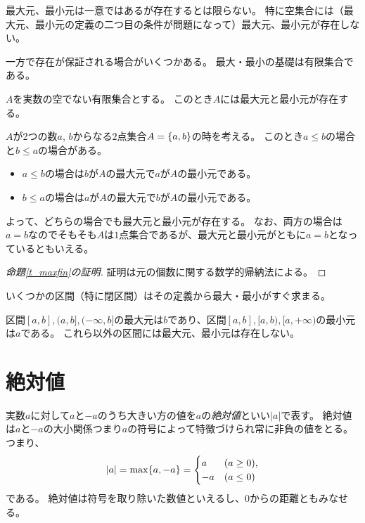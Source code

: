 最大元、最小元は一意ではあるが存在するとは限らない。
特に空集合には（最大元、最小元の定義の二つ目の条件が問題になって）最大元、最小元が存在しない。

一方で存在が保証される場合がいくつかある。
最大・最小の基礎は有限集合である。

\begin{proposition}
\label{t_maxfin}
$A$を実数の空でない有限集合とする。
このとき$A$には最大元と最小元が存在する。
\end{proposition}

\begin{example}
$A$が2つの数$a$, $b$からなる$2$点集合$A = \{ a, b \}$の時を考える。
このとき$a \le b$の場合と$b \le a$の場合がある。
\begin{itemize}
\item
$a \le b$の場合は$b$が$A$の最大元で$a$が$A$の最小元である。
\item
$b \le a$の場合は$a$が$A$の最大元で$b$が$A$の最小元である。
\end{itemize}
よって、どちらの場合でも最大元と最小元が存在する。
なお、両方の場合は$a = b$なのでそもそも$A$は$1$点集合であるが、最大元と最小元がともに$a = b$となっているともいえる。
\end{example}

\begin{proof}[命題\ref{t_maxfin}の証明]
証明は元の個数に関する数学的帰納法による。
\end{proof}

いくつかの区間（特に閉区間）はその定義から最大・最小がすぐ求まる。

\begin{example}
区間$[a, b], (a, b], (-\infty, b]$の最大元は$b$であり、区間$[a, b], [a, b), [a, +\infty)$の最小元は$a$である。
これら以外の区間には最大元、最小元は存在しない。
\end{example}

\section{絶対値}

実数$a$に対して$a$と$-a$のうち大きい方の値を$a$の\emph{絶対値}といい$|a|$で表す。
絶対値は$a$と$-a$の大小関係つまり$a$の符号によって特徴づけられ常に非負の値をとる。
つまり、
$$
|a| = \max\{ a, -a \} =
\begin{cases}
a & \text{($a \ge 0$),} \\
-a & \text{($a \le 0$)}
\end{cases}
$$
である。
絶対値は符号を取り除いた数値といえるし、$0$からの距離ともみなせる。

